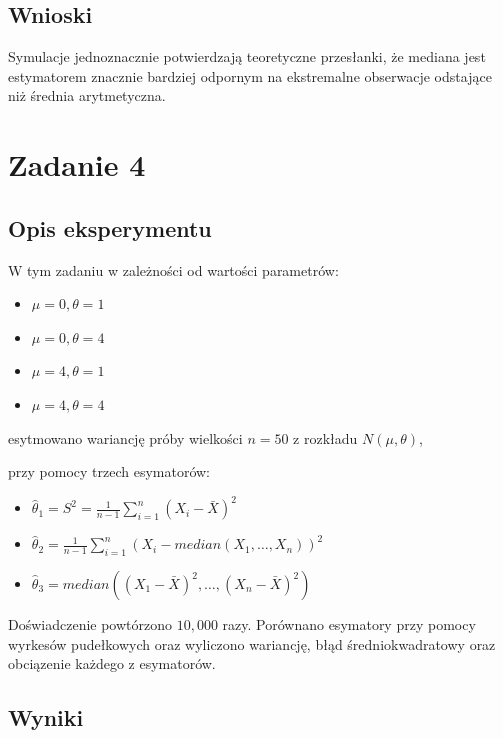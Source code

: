 \documentclass[a4paper,12pt]{article}
\begin{document}
\subsection*{Wnioski}
Symulacje jednoznacznie potwierdzają teoretyczne przesłanki, że mediana jest estymatorem znacznie bardziej odpornym na ekstremalne obserwacje odstające niż średnia arytmetyczna.


\section{Zadanie 4}

\subsection{Opis eksperymentu}
W tym zadaniu w zależności od wartości parametrów: 

\begin{itemize}
    \item $\mu=0, \theta=1$
    \item $\mu=0, \theta=4$
    \item $\mu=4, \theta=1$
    \item $\mu=4, \theta=4$
\end{itemize}

esytmowano wariancję próby wielkości $n=50$ z rozkładu $N(\mu, \theta)$,

przy pomocy trzech esymatorów:

\begin{itemize}
    \item $\hat{\theta}_1 = S^{2} = \frac{1}{n-1}\sum_{i=1}^{n}(X_{i}-\bar{X})^{2}$
    \item $\hat{\theta}_2 = \frac{1}{n-1}\sum_{i=1}^{n}(X_{i} - median(X_{1}, \dots, X_{n}))^{2}$
    \item $\hat{\theta}_3 = median((X_1 - \bar{X})^{2}, \dots, (X_{n} -\bar{X})^2)$
\end{itemize}

Doświadczenie powtórzono $10{,}000$ razy. Porównano esymatory przy pomocy wyrkesów pudełkowych oraz
wyliczono wariancję, błąd średniokwadratowy oraz obciązenie każdego z esymatorów. 

\subsection{Wyniki}
\end{document}

